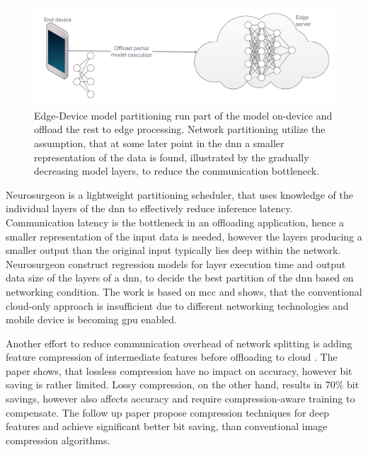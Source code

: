 \begin{figure}
	\centering
	\includegraphics[width=\linewidth]{figures/models/partitioning}
	\caption[Model partitioning]{Edge-Device model partitioning run part of the model on-device and offload the rest to edge processing. Network partitioning utilize the assumption, that at some later point in the \gls{dnn} a smaller representation of the data is found, illustrated by the gradually decreasing model layers, to reduce the communication bottleneck. }
	\label{fig:offlaoding}
\end{figure}

Neurosurgeon \cite{kang_neurosurgeon:_2017} is a lightweight partitioning scheduler, that uses knowledge of the individual layers of the \gls{dnn} to effectively reduce inference latency. Communication latency is the bottleneck in an offloading application, hence a smaller representation of the input data is needed, however the layers producing a smaller output than the original input typically lies deep within the network. Neurosurgeon construct regression models for layer execution time and  output data size of the layers of a \gls{dnn}, to decide the best partition of the \gls{dnn} based on networking condition. The work is based on \gls{mcc} and shows, that the conventional cloud-only approach is insufficient due to different networking technologies and mobile device is becoming \gls{gpu} enabled. 

Another effort to reduce communication overhead of network splitting is adding feature compression of intermediate features before offloading to cloud \cite{choi_deep_2018}. The paper shows, that lossless compression have no impact on accuracy, however bit saving is rather limited. Lossy compression, on the other hand, results in 70\% bit savings, however also affects accuracy and require compression-aware training to compensate. The follow up paper \cite{choi_near-lossless_2018} propose compression techniques for deep features and achieve significant better bit saving, than conventional image compression algorithms.

